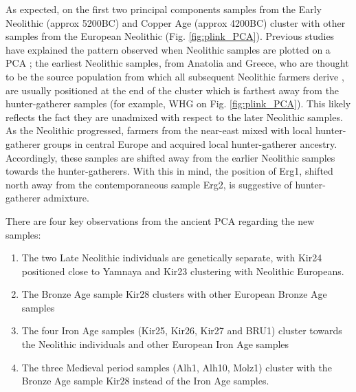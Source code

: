 As expected, on the first two principal components samples from the Early Neolithic (approx 5200BC) and Copper Age (approx 4200BC) cluster with other samples from the European Neolithic (Fig. \ref{fig:plink_PCA}). Previous studies have explained the pattern observed when Neolithic samples are plotted on a PCA \cite{Lipson2017b}; the earliest Neolithic samples, from Anatolia and Greece, who are thought to be the source population from which all subsequent Neolithic farmers derive \cite{Hofmanova2016, Haak2010, haak2005ancient, bramanti2009genetic, Lazaridis2014}, are usually positioned at the end of the cluster which is farthest away from the hunter-gatherer samples (for example, WHG on Fig. \ref{fig:plink_PCA}). This likely reflects the fact they are unadmixed with respect to the later Neolithic samples. As the Neolithic progressed, farmers from the near-east mixed with local hunter-gatherer groups in central Europe \cite{Lipson2017b} and acquired local hunter-gatherer ancestry. Accordingly, these samples are shifted away from the earlier Neolithic samples towards the hunter-gatherers. With this in mind, the position of Erg1, shifted north away from the contemporaneous sample Erg2, is suggestive of hunter-gatherer admixture. 

There are four key observations from the ancient PCA regarding the new samples:

\begin{enumerate}
\item The two Late Neolithic individuals are genetically separate, with Kir24 positioned close to Yamnaya and Kir23 clustering with Neolithic Europeans.
\item The Bronze Age sample Kir28 clusters with other European Bronze Age samples
\item The four Iron Age samples (Kir25, Kir26, Kir27 and BRU1) cluster towards the Neolithic individuals and other European Iron Age samples
\item The three Medieval period samples (Alh1, Alh10, Molz1) cluster with the Bronze Age sample Kir28 instead of the Iron Age samples.
\end{enumerate}

